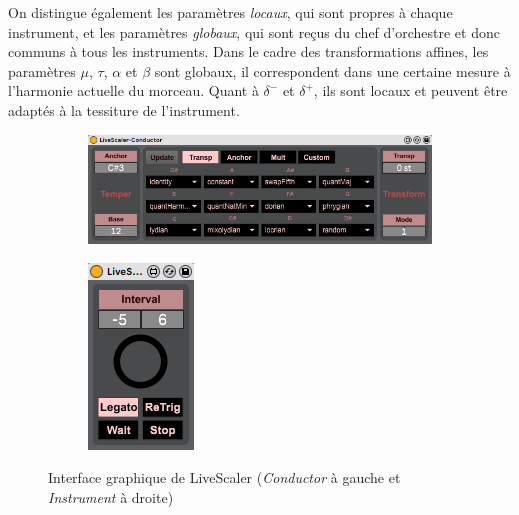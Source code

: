 On distingue également les paramètres \emph{locaux}, qui sont propres à chaque instrument, et les paramètres \emph{globaux}, qui sont reçus du chef d'orchestre et donc communs à tous les instruments. Dans le cadre des transformations affines, les paramètres $\mu$, $\tau$, $\alpha$  et $\beta$ sont globaux, il correspondent dans une certaine mesure à l'harmonie actuelle du morceau. Quant à $\delta^-$ et $\delta^+$, ils sont locaux et peuvent être adaptés à la tessiture de l'instrument.
\begin{figure}[h]
  \centering
  \begin{subfigure}{0.83\textwidth}
    \includegraphics{Figures/LS-Conductor-UI.png}
  \end{subfigure}
  \begin{subfigure}{0.15\textwidth}
    \includegraphics{Figures/LS-Instrument-UI.png}
  \end{subfigure}
  
  \caption{Interface graphique de LiveScaler (\emph{Conductor} à gauche  et  \emph{Instrument} à droite) }
  \label{fig:LiveScalerUI}
\end{figure}
